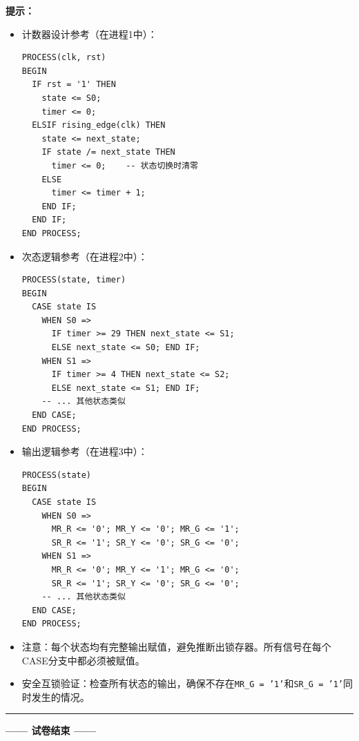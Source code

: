 \begin{framed}
\textbf{提示：}
\begin{itemize}
  \item 计数器设计参考（在进程1中）：
\begin{verbatim}
PROCESS(clk, rst)
BEGIN
  IF rst = '1' THEN
    state <= S0;
    timer <= 0;
  ELSIF rising_edge(clk) THEN
    state <= next_state;
    IF state /= next_state THEN
      timer <= 0;    -- 状态切换时清零
    ELSE
      timer <= timer + 1;
    END IF;
  END IF;
END PROCESS;
\end{verbatim}
  \item 次态逻辑参考（在进程2中）：
\begin{verbatim}
PROCESS(state, timer)
BEGIN
  CASE state IS
    WHEN S0 =>
      IF timer >= 29 THEN next_state <= S1;
      ELSE next_state <= S0; END IF;
    WHEN S1 =>
      IF timer >= 4 THEN next_state <= S2;
      ELSE next_state <= S1; END IF;
    -- ... 其他状态类似
  END CASE;
END PROCESS;
\end{verbatim}
  \item 输出逻辑参考（在进程3中）：
\begin{verbatim}
PROCESS(state)
BEGIN
  CASE state IS
    WHEN S0 =>
      MR_R <= '0'; MR_Y <= '0'; MR_G <= '1';
      SR_R <= '1'; SR_Y <= '0'; SR_G <= '0';
    WHEN S1 =>
      MR_R <= '0'; MR_Y <= '1'; MR_G <= '0';
      SR_R <= '1'; SR_Y <= '0'; SR_G <= '0';
    -- ... 其他状态类似
  END CASE;
END PROCESS;
\end{verbatim}
  \item 注意：每个状态均有完整输出赋值，避免推断出锁存器。所有信号在每个CASE分支中都必须被赋值。
  \item 安全互锁验证：检查所有状态的输出，确保不存在\texttt{MR\_G = '1'}和\texttt{SR\_G = '1'}同时发生的情况。
\end{itemize}
\end{framed}

\vspace{0.8cm}
{\centering
\rule{0.8\textwidth}{0.5pt}
\vspace{0.3cm}

\textbf{—— 试卷结束 ——}

\vspace{0.5cm}}

\endinput
